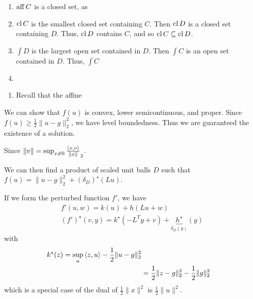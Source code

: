 \begin{exercises}
\item
  \begin{enumerate}
  \item $\operatorname*{aff} C$ is a closed set, as  
  \item $\operatorname*{cl} C$ is the smallest closed set containing $C$.  Then $\operatorname*{cl}
    D$ is a closed set containing $D$.  Thus, $\operatorname*{cl} D$ contains $C$,
    and so $\operatorname*{cl} C \subseteq \operatorname*{cl} D$.
  \item $\int D$ is the largest open set contained in $D$. Then $\int
    C$ is an open set contained in $D$.  Thus, $\int C$ 

  \item {}
  \end{enumerate}
\item
  \begin{enumerate}
  \item Recall that the affine
  \end{enumerate}
\item 
\item
\item
\item
\item
\item
\item
\item
\item We can show that $f(u)$ is convex, lower semicontinuous, and
  proper. Since $f(u) \geq \frac{1}{2} \| u - g \|_{2}^{2}$, we have
  level boundedness.  Thus we are guaranteed the existence of a
  solution.

  Since $\| v \| = \sup_{x \neq 0} \frac{\IP{x, v}}{\| x \|}_{2}$.

  We can then find a product of scaled unit balls $D$ such that $f(u) = \| u
  - g \|_{2}^{2} + (\delta_{D})^{\star}(Lu)$.

  If we form the perturbed function $f'$, we have
  \begin{align}
    \label{eq:36}
    f'(u, w) = k(u) + h(Lu + w) \\
    (f')^{\star}(v, y) = k^{\star}(-L^{T}y + v) +
    \underbrace{h^{\star}}_{\delta_{D}(y)}(y) 
  \end{align} with
  \begin{align}
    \label{eq:38}
    k^{\star}(z) = \sup_{u} \IP{z, u} - \frac{1}{2}\| u - g \|_{2}^{2}
    \\
    &= \frac{1}{2} \| z - g \|_{2}^{2} - \frac{1}{2} \| g \|_{2}^{2}
  \end{align} which is a special case of the dual of $\frac{1}{2} \| x
  \|^{2}$ is $\frac{1}{2} \| u \|^{2}$.


\end{exercises}
